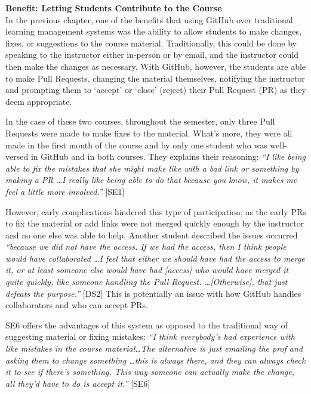 \textbf{Benefit: Letting Students Contribute to the Course} \\ %
In the previous chapter, one of the benefits that using GitHub over traditional learning management systems was the ability to allow students to make changes, fixes, or suggestions to the course material. Traditionally, this could be done by speaking to the instructor either in-person or by email, and the instructor could then make the changes as necessary. With GitHub, however, the students are able to make Pull Requests, changing the material themselves, notifying the instructor and prompting them to `accept' or `close' (reject) their Pull Request (PR) as they deem appropriate.

In the case of these two courses, throughout the semester, only three Pull Requests were made to make fixes to the material. What's more, they were all made in the first month of the course and by only one student who was well-versed in GitHub and in both courses. They explains their reasoning: \textit{``I like being able to fix the mistakes that she might make like with a bad link or something by making a PR \ldots I really like being able to do that because you know, it makes me feel a little more involved.''} [SE1]

However, early complications hindered this type of participation, as the early PRs to fix the material or add links were not merged quickly enough by the instructor and no one else was able to help. Another student described the issues occurred \textit{``because we did not have the access. If we had the access, then I think people would have collaborated \ldots I feel that either we should have had the access to merge it, or at least someone else would have had [access] who would have merged it quite quickly, like someone handling the Pull Request. \ldots [Otherwise], that just defeats the purpose.''} [DS2] This is potentially an issue with how GitHub handles collaborators and who can accept PRs.

SE6 offers the advantages of this system as opposed to the traditional way of suggesting material or fixing mistakes: \textit{``I think everybody's had experience with like mistakes in the course material\ldots The alternative is just emailing the prof and asking them to change something \ldots this is always there, and they can always check it to see if there's something. This way someone can actually make the change, all they'd have to do is accept it.''} [SE6]

